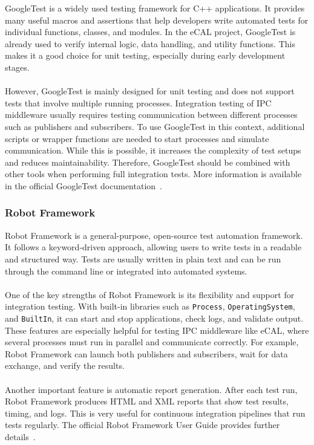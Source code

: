 GoogleTest is a widely used testing framework for C++ applications. It provides many useful macros and assertions that help developers write automated tests for individual functions, classes, and modules. In the eCAL project, GoogleTest is already used to verify internal logic, data handling, and utility functions. This makes it a good choice for unit testing, especially during early development stages.
\\
\\
However, GoogleTest is mainly designed for unit testing and does not support tests that involve multiple running processes. Integration testing of IPC middleware usually requires testing communication between different processes such as publishers and subscribers. To use GoogleTest in this context, additional scripts or wrapper functions are needed to start processes and simulate communication. While this is possible, it increases the complexity of test setups and reduces maintainability. Therefore, GoogleTest should be combined with other tools when performing full integration tests. More information is available in the official GoogleTest documentation~\cite{GoogleTestDocs}.

\subsubsection*{Robot Framework}

Robot Framework is a general-purpose, open-source test automation framework. It follows a keyword-driven approach, allowing users to write tests in a readable and structured way. Tests are usually written in plain text and can be run through the command line or integrated into automated systems.
\\
\\
One of the key strengths of Robot Framework is its flexibility and support for integration testing. With built-in libraries such as \texttt{Process}, \texttt{OperatingSystem}, and \texttt{BuiltIn}, it can start and stop applications, check logs, and validate output. These features are especially helpful for testing IPC middleware like eCAL, where several processes must run in parallel and communicate correctly. For example, Robot Framework can launch both publishers and subscribers, wait for data exchange, and verify the results.
\\
\\
Another important feature is automatic report generation. After each test run, Robot Framework produces HTML and XML reports that show test results, timing, and logs. This is very useful for continuous integration pipelines that run tests regularly. The official Robot Framework User Guide provides further details~\cite{RobotFrameworkDocs}.

